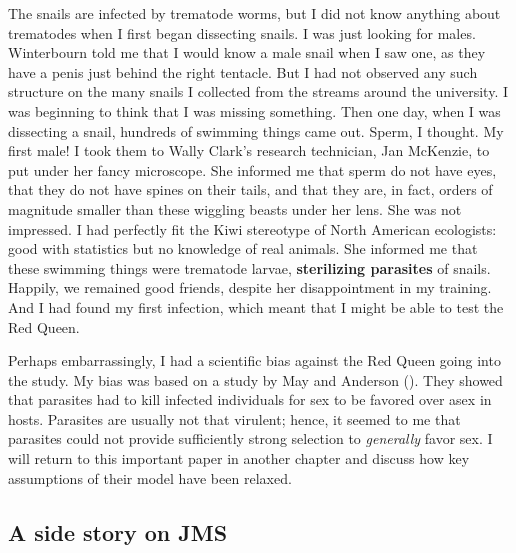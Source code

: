 \documentclass[
  letterpaper,
]{book}
\begin{document}
The snails are infected by trematode worms, but I did not know anything
about trematodes when I first began dissecting snails. I was just
looking for males. Winterbourn told me that I would know a male snail
when I saw one, as they have a penis just behind the right tentacle. But
I had not observed any such structure on the many snails I collected
from the streams around the university. I was beginning to think that I
was missing something. Then one day, when I was dissecting a snail,
hundreds of swimming things came out. Sperm, I thought. My first male! I
took them to Wally Clark's research technician, Jan McKenzie, to put
under her fancy microscope. She informed me that sperm do not have eyes,
that they do not have spines on their tails, and that they are, in fact,
orders of magnitude smaller than these wiggling beasts under her lens.
She was not impressed. I had perfectly fit the Kiwi stereotype of North
American ecologists: good with statistics but no knowledge of real
animals. She informed me that these swimming things were trematode
larvae, \textbf{sterilizing parasites} of snails. Happily, we remained
good friends, despite her disappointment in my training. And I had found
my first infection, which meant that I might be able to test the Red
Queen.

Perhaps embarrassingly, I had a scientific bias against the Red Queen
going into the study. My bias was based on a study by May and Anderson
(). They showed that
parasites had to kill infected individuals for sex to be favored over
asex in hosts. Parasites are usually not that virulent; hence, it seemed
to me that parasites could not provide sufficiently strong selection to
\emph{generally} favor sex. I will return to this important paper in
another chapter and discuss how key assumptions of their model have been
relaxed.

\subsection{A side story on JMS}\label{a-side-story-on-jms}
\end{document}
